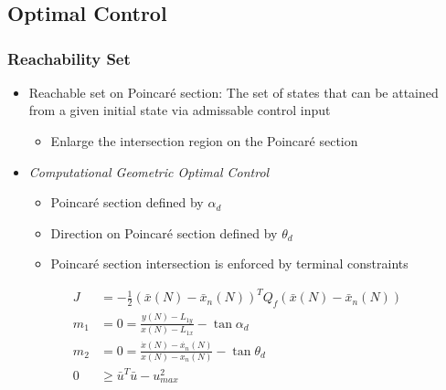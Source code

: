 \section*{}
\subsection*{Optimal Control}
\begin{frame} %
\frametitle{Reachability Set}
  \begin{itemize}
  \item Reachable set on Poincar\'e section: The set of states that can be attained from a given initial state via admissable control input
  		\begin{itemize}
  			\item Enlarge the intersection region on the Poincar\'e section
  		\end{itemize}
  \item \emph{Computational Geometric Optimal Control}
	\begin{itemize}
  		\item Poincar\'e section defined by \( \alpha_d \)
		\item Direction on Poincar\'e section defined by \( \theta_d \)
	  	\item Poincar\'e section intersection is enforced by terminal constraints
	\end{itemize}
 \end{itemize}
  \begin{align*}
	J &= -\frac{1}{2} \left( \bar{x}(N) - \bar{x}_{n}(N)\right)^T Q_f\left( \bar{x}(N) - \bar{x}_{n}(N)\right)\\
	m_1 &= 0 = \frac{y(N) - L_{1y}}{x(N) - L_{1x}} - \tan{\alpha_d} \\ 
    m_2&= 0 = \frac{\dot{x}(N) - \dot{x_n}(N) }{x(N) -x_n(N) } - \tan{\theta_d} \\
	 0 &\geq\bar{u}^T \bar{u} - u_{max}^2 
	\end{align*}

\end{frame}   %

